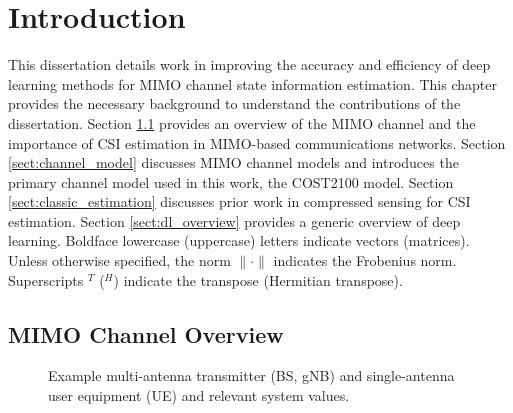 \chapter{Introduction}
\label{chap:intro}


This dissertation details work in improving the accuracy and efficiency of deep learning methods for MIMO channel state information estimation. This chapter provides the necessary background to understand the contributions of the dissertation. Section \ref{sect:mimo_model} provides an overview of the MIMO channel and the importance of CSI estimation in MIMO-based communications networks. Section \ref{sect:channel_model} discusses MIMO channel models and introduces the primary channel model used in this work, the COST2100 model. Section \ref{sect:classic_estimation} discusses prior work in compressed sensing for CSI estimation. Section \ref{sect:dl_overview} provides a generic overview of deep learning. 
Boldface lowercase (uppercase) letters indicate vectors (matrices). Unless otherwise specified, the norm $\|\cdot\|$ indicates the Frobenius norm. Superscripts $^T$ ($^H$) indicate the transpose (Hermitian transpose).

\section{MIMO Channel Overview}
\label{sect:mimo_model}

\begin{figure}[!hbtp]
\centering
{
	\fontsize{6pt}{8pt}
	\def\svgwidth{0.8\columnwidth}
	
}
\caption{Example multi-antenna transmitter (BS, gNB) and single-antenna user equipment (UE) and relevant system values.}
\label{fig:mimo_schematic}
\end{figure}

